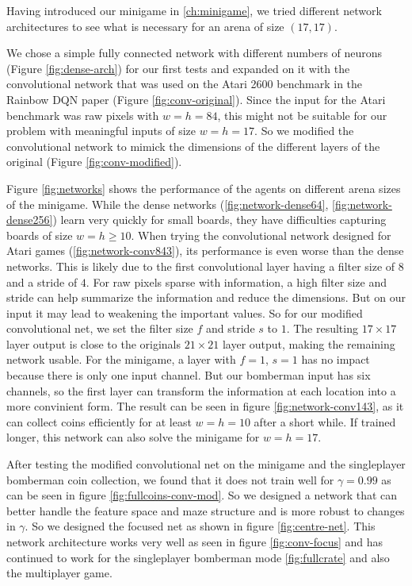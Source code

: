 
Having introduced our minigame in \ref{ch:minigame}, we tried different network architectures to see what is necessary for an arena of size $(17, 17)$.


We chose a simple fully connected network with different numbers of neurons (Figure \ref{fig:dense-arch}) for our first tests and expanded on it with the convolutional network that was used on the Atari 2600 benchmark in the Rainbow DQN paper\cite{Hessel2018RainbowCI} (Figure \ref{fig:conv-original}). Since the input for the Atari benchmark was raw pixels with $w=h=84$, this might not be suitable for our problem with meaningful inputs of size $w=h=17$. So we modified the convolutional network to mimick the dimensions of the different layers of the original (Figure \ref{fig:conv-modified}).


Figure \ref{fig:networks} shows the performance of the agents on different arena sizes of the minigame. While the dense networks (\ref{fig:network-dense64}, \ref{fig:network-dense256}) learn very quickly for small boards, they have difficulties capturing boards of size $w=h\geq10$. When trying the convolutional network designed for Atari games (\ref{fig:network-conv843}), its performance is even worse than the dense networks. This is likely due to the first convolutional layer having a filter size of $8$ and a stride of $4$. For raw pixels sparse with information, a high filter size and stride can help summarize the information and reduce the dimensions. But on our input it may lead to weakening the important values.
So for our modified convolutional net, we set the filter size $f$ and stride $s$ to $1$. The resulting $17\times17$ layer output is close to the originals $21\times21$ layer output, making the remaining network usable. For the minigame, a layer with $f=1$, $s=1$ has no impact because there is only one input channel. But our bomberman input has six channels, so the first layer can transform the information at each location into a more convinient form. The result can be seen in figure \ref{fig:network-conv143}, as it can collect coins efficiently for at least $w=h=10$ after a short while. If trained longer, this network can also solve the minigame for $w=h=17$.




After testing the modified convolutional net on the minigame and the singleplayer bomberman coin collection, we found that it does not train well for $\gamma=0.99$ as can be seen in figure \ref{fig:fullcoins-conv-mod}. So we designed a network that can better handle the feature space and maze structure and is more robust to changes in $\gamma$. So we designed the focused net as shown in figure \ref{fig:centre-net}. This network architecture works very well as seen in figure \ref{fig:conv-focus} and has continued to work for the singleplayer bomberman mode \ref{fig:fullcrate} and also the multiplayer game.

